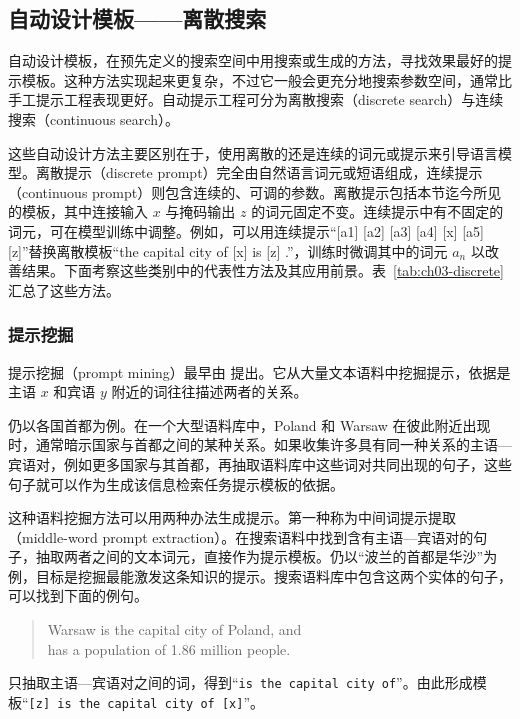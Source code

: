 \subsection{自动设计模板——离散搜索}
自动设计模板，在预先定义的搜索空间中用搜索或生成的方法，寻找效果最好的提示模板。这种方法实现起来更复杂，不过它一般会更充分地搜索参数空间，通常比手工提示工程表现更好。自动提示工程可分为离散搜索（discrete search）与连续搜索（continuous search）。

这些自动设计方法主要区别在于，使用离散的还是连续的词元或提示来引导语言模型。离散提示（discrete prompt）完全由自然语言词元或短语组成，连续提示（continuous prompt）则包含连续的、可调的参数。离散提示包括本节迄今所见的模板，其中连接输入 $x$ 与掩码输出 $z$ 的词元固定不变。连续提示中有不固定的词元，可在模型训练中调整。例如，可以用连续提示“[a1] [a2] [a3] [a4] [x] [a5] [z]”替换离散模板“the capital city of [x] is [z] .”，训练时微调其中的词元 $a_n$ 以改善结果。下面考察这些类别中的代表性方法及其应用前景。表~\ref{tab:ch03-discrete} 汇总了这些方法。

\subsubsection{提示挖掘}
提示挖掘（prompt mining）最早由 提出。它从大量文本语料中挖掘提示，依据是主语 $x$ 和宾语 $y$ 附近的词往往描述两者的关系。

\begin{keypoint}
仍以各国首都为例。在一个大型语料库中，Poland 和 Warsaw 在彼此附近出现时，通常暗示国家与首都之间的某种关系。如果收集许多具有同一种关系的主语—宾语对，例如更多国家与其首都，再抽取语料库中这些词对共同出现的句子，这些句子就可以作为生成该信息检索任务提示模板的依据。
\end{keypoint}

这种语料挖掘方法可以用两种办法生成提示。第一种称为中间词提示提取（middle-word prompt extraction）。在搜索语料中找到含有主语—宾语对的句子，抽取两者之间的文本词元，直接作为提示模板。仍以“波兰的首都是华沙”为例，目标是挖掘最能激发这条知识的提示。搜索语料库中包含这两个实体的句子，可以找到下面的例句。
\begin{quote}
\ttfamily
Warsaw is the capital city of Poland, and\\
has a population of 1.86 million people.
\end{quote}
只抽取主语—宾语对之间的词，得到“\texttt{is the capital city of}”。由此形成模板“\texttt{[z] is the capital city of [x]}”。


